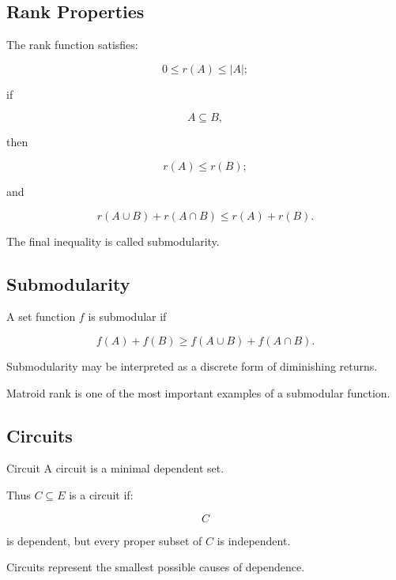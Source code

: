 \subsection{Rank Properties}
\label{subsec:rank-properties-matroid}

The rank function satisfies:

\[
\boxed{
0\leq r(A)\leq|A|;
}
\]

if

\[
A\subseteq B,
\]

then

\[
\boxed{
r(A)\leq r(B);
}
\]

and

\[
\boxed{
r(A\cup B)+r(A\cap B)
\leq
r(A)+r(B).
}
\]

The final inequality is called submodularity.

\subsection{Submodularity}
\label{subsec:matroid-submodularity}

A set function \(f\) is submodular if

\[
\boxed{
f(A)+f(B)
\geq
f(A\cup B)+f(A\cap B).
}
\]

Submodularity may be interpreted as a discrete form of diminishing
returns.

Matroid rank is one of the most important examples of a submodular
function.

\subsection{Circuits}
\label{subsec:matroid-circuits}

\begin{definitionbox}{Circuit}
A circuit is a minimal dependent set.
\end{definitionbox}

Thus \(C\subseteq E\) is a circuit if:

\[
C
\]

is dependent, but every proper subset of \(C\) is independent.

Circuits represent the smallest possible causes of dependence.

